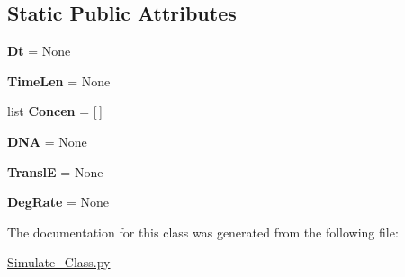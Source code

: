 \subsection*{Static Public Attributes}
\begin{DoxyCompactItemize}
\item 
\hypertarget{classweb_1_1_simulate___class_1_1m_r_n_a___simulate_aff71f631c32c2e13789fb4f2e413feb5}{{\bfseries Dt} = None}\label{classweb_1_1_simulate___class_1_1m_r_n_a___simulate_aff71f631c32c2e13789fb4f2e413feb5}

\item 
\hypertarget{classweb_1_1_simulate___class_1_1m_r_n_a___simulate_a1fbca90fe65ec4c5a6e07ef6aab4ef4f}{{\bfseries Time\-Len} = None}\label{classweb_1_1_simulate___class_1_1m_r_n_a___simulate_a1fbca90fe65ec4c5a6e07ef6aab4ef4f}

\item 
\hypertarget{classweb_1_1_simulate___class_1_1m_r_n_a___simulate_a8d08b83d4273c7c21c20fedc33d71d46}{list {\bfseries Concen} = \mbox{[}$\,$\mbox{]}}\label{classweb_1_1_simulate___class_1_1m_r_n_a___simulate_a8d08b83d4273c7c21c20fedc33d71d46}

\item 
\hypertarget{classweb_1_1_simulate___class_1_1m_r_n_a___simulate_a93f85081905b6beb3c395793f15b2956}{{\bfseries D\-N\-A} = None}\label{classweb_1_1_simulate___class_1_1m_r_n_a___simulate_a93f85081905b6beb3c395793f15b2956}

\item 
\hypertarget{classweb_1_1_simulate___class_1_1m_r_n_a___simulate_a0f1d34dcecf981a5dac457ce57260ead}{{\bfseries Transl\-E} = None}\label{classweb_1_1_simulate___class_1_1m_r_n_a___simulate_a0f1d34dcecf981a5dac457ce57260ead}

\item 
\hypertarget{classweb_1_1_simulate___class_1_1m_r_n_a___simulate_ab0f22fbf0ee72dcac2743805b982aab8}{{\bfseries Deg\-Rate} = None}\label{classweb_1_1_simulate___class_1_1m_r_n_a___simulate_ab0f22fbf0ee72dcac2743805b982aab8}

\end{DoxyCompactItemize}


The documentation for this class was generated from the following file\-:\begin{DoxyCompactItemize}
\item 
\hyperlink{_simulate___class_8py}{Simulate\-\_\-\-Class.\-py}\end{DoxyCompactItemize}
